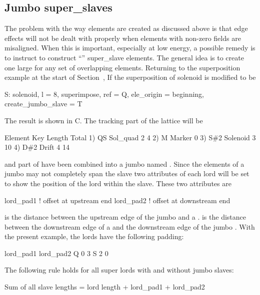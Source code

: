 \subsection{Jumbo super_slaves}
\label{s:jumbo.slave}

The problem with the way  elements are created as
discussed above is that edge effects will not be dealt with properly
when elements with non-zero fields are misaligned. When this is
important, especially at low energy, a possible remedy is to instruct
\bmad to construct ``'' super_slave elements. The general
idea is to create one large  for any set of
overlapping elements. Returning to the superposition example at the
start of Section~, If the superposition of solenoid 
is modified to be
\begin{example}
  S: solenoid, l = 8, superimpose, ref = Q, ele_origin = beginning, 
               create_jumbo_slave = T
\end{example}
The result is shown in C. The tracking part of the lattice
will be
\begin{example}
        Element   Key         Length  Total     
  1)    Q{\B}S       Sol_quad     2        4
  2)    M         Marker       0      
  3)    S{\#}2       Solenoid     3       10
  4)    D{\#}2       Drift        4       14
\end{example}
 and part of  have been combined into a jumbo
 named . Since the  elements
of a jumbo  may not completely span the slave two
attributes of each lord will be set to show the position of the lord
within the slave. These two attributes are
\begin{example}
  lord_pad1    ! offset at upstream end
  lord_pad2    ! offset at downstream end
\end{example}
 is the distance between the upstream edge of the jumbo
 and a .  is the distance 
between the downstream edge of a  and the downstream edge
of the jumbo . With the present example, the lords have
the following padding:
\begin{example}
          lord_pad1    lord_pad2
  Q            0            3
  S            2            0
\end{example}
The following rule holds for all super lords with and without jumbo slaves:
\begin{example}
  Sum of all slave lengths = lord length + lord_pad1 + lord_pad2
\end{example}

